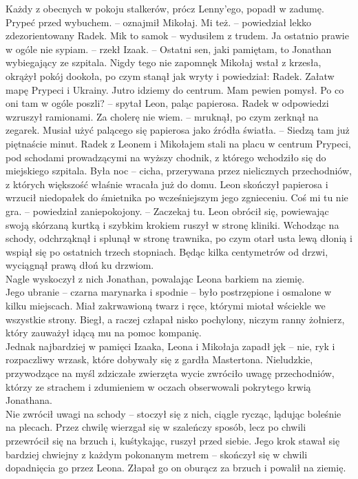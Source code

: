 \documentclass[../MAIN.tex]{subfiles}
\begin{document}
\qd
Każdy z obecnych w pokoju stalkerów, prócz Lenny’ego, popadł w zadumę.
\sx Prypeć przed wybuchem. -- oznajmił Mikołaj.
\xx Mi też. -- powiedział lekko zdezorientowany Radek.
\xx Mi\3k to samo\3k -- wydusiłem z trudem.
\xx Ja ostatnio prawie w ogóle nie sypiam. -- rzekł Izaak. -- Ostatni sen, jaki pamiętam, to Jonathan wybiegający ze szpitala. Nigdy tego nie zapomnę\3k
\qd
Mikołaj wstał z krzesła, okrążył pokój dookoła, po czym stanął jak wryty i powiedział:
\sx Radek. Załatw mapę Prypeci i Ukrainy. Jutro idziemy do centrum. Mam pewien pomysł.
\qd
% 
% 
\sx Po co oni tam w ogóle poszli? -- spytał Leon, paląc papierosa.
\qd
Radek w odpowiedzi wzruszył ramionami.
\sx Za cholerę nie wiem. -- mruknął, po czym zerknął na zegarek. Musiał użyć palącego się papierosa jako źródła światła. -- Siedzą tam już piętnaście minut.
\qd
Radek z Leonem i Mikołajem stali na placu w centrum Prypeci, pod schodami prowadzącymi na wyższy chodnik, z którego wchodziło się do miejskiego szpitala. Była noc -- cicha, przerywana przez nielicznych przechodniów, z których większość właśnie wracała już do domu. Leon skończył papierosa i wrzucił niedopałek do śmietnika po wcześniejszym jego zgnieceniu.
\sx Coś mi tu nie gra. -- powiedział zaniepokojony. -- Zaczekaj tu.
\qd
Leon obrócił się, powiewając swoją skórzaną kurtką i szybkim krokiem ruszył w stronę kliniki. Wchodząc na schody, odchrząknął i splunął w stronę trawnika, po czym otarł usta lewą dłonią i wspiął się po ostatnich trzech stopniach. Będąc kilka centymetrów od drzwi, wyciągnął prawą dłoń ku drzwiom.\\
Nagle wyskoczył z nich Jonathan, powalając Leona barkiem na ziemię.\\
Jego ubranie -- czarna marynarka i spodnie -- było postrzępione i osmalone w kilku miejscach. Miał zakrwawioną twarz i ręce, którymi miotał wściekle we wszystkie strony. Biegł, a raczej człapał nisko pochylony, niczym ranny żołnierz, który zauważył idącą mu na pomoc kompanię.\\
Jednak najbardziej w pamięci Izaaka, Leona i Mikołaja zapadł jęk -- nie, ryk i rozpaczliwy wrzask, które dobywały się z gardła Mastertona. Nieludzkie, przywodzące na myśl zdziczałe zwierzęta wycie zwróciło uwagę przechodniów, którzy ze strachem i zdumieniem w oczach obserwowali pokrytego krwią Jonathana.\\
Nie zwrócił uwagi na schody -- stoczył się z nich, ciągle rycząc, lądując boleśnie na plecach. Przez chwilę wierzgał się w szaleńczy sposób, lecz po chwili przewrócił się na brzuch i, kuśtykając, ruszył przed siebie. Jego krok stawał się bardziej chwiejny z każdym pokonanym metrem -- skończył się w chwili dopadnięcia go przez Leona. Złapał go on oburącz za brzuch i powalił na ziemię.\\
\end{document}
